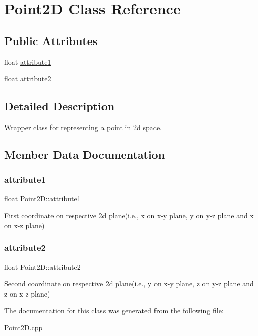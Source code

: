 \hypertarget{class_point2_d}{}\section{Point2D Class Reference}
\label{class_point2_d}
\subsection*{Public Attributes}
\begin{DoxyCompactItemize}
\item 
float \hyperlink{class_point2_d_aa2fd2e328c04e4429e584cb63a604996}{attribute1}
\item 
float \hyperlink{class_point2_d_acd2a8c4b5502f3cbb08810125ab9cb7d}{attribute2}
\end{DoxyCompactItemize}


\subsection{Detailed Description}
Wrapper class for representing a point in 2d space. 

\subsection{Member Data Documentation}
\mbox{\label{class_point2_d_aa2fd2e328c04e4429e584cb63a604996}} 
\subsubsection{\texorpdfstring{attribute1}{attribute1}}
{\footnotesize\ttfamily float Point2\+D\+::attribute1}

First coordinate on respective 2d plane(i.\+e., x on x-\/y plane, y on y-\/z plane and x on x-\/z plane) \mbox{\label{class_point2_d_acd2a8c4b5502f3cbb08810125ab9cb7d}} 
\subsubsection{\texorpdfstring{attribute2}{attribute2}}
{\footnotesize\ttfamily float Point2\+D\+::attribute2}

Second coordinate on respective 2d plane(i.\+e., y on x-\/y plane, z on y-\/z plane and z on x-\/z plane) 

The documentation for this class was generated from the following file\+:\begin{DoxyCompactItemize}
\item 
\hyperlink{_point2_d_8cpp}{Point2\+D.\+cpp}\end{DoxyCompactItemize}
